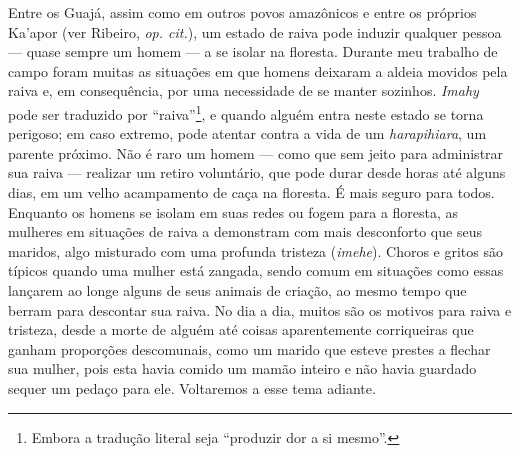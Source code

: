 Entre os Guajá, assim como em outros povos amazônicos e entre os
próprios Ka'apor (ver Ribeiro, \emph{op. cit.}), um estado de raiva pode
induzir qualquer pessoa --- quase sempre um homem --- a se isolar na
floresta. Durante meu trabalho de campo foram muitas as situações em que
homens deixaram a aldeia movidos pela raiva e, em consequência, por uma
necessidade de se manter sozinhos. \emph{Imahy} pode ser traduzido por
``raiva''\footnote{Embora a tradução literal seja ``produzir dor a si
  mesmo''.}, e quando alguém entra neste estado se torna perigoso; em
caso extremo, pode atentar contra a vida de um \emph{harapihiara}, um
parente próximo. Não é raro um homem --- como que sem jeito para
administrar sua raiva --- realizar um retiro voluntário, que pode durar
desde horas até alguns dias, em um velho acampamento de caça na
floresta. É mais seguro para todos. Enquanto os homens se isolam em suas
redes ou fogem para a floresta, as mulheres em situações de raiva a
demonstram com mais desconforto que seus maridos, algo misturado com uma
profunda tristeza (\emph{imehe}). Choros e gritos são típicos quando uma
mulher está zangada, sendo comum em situações como essas lançarem ao
longe alguns de seus animais de criação, ao mesmo tempo que berram para
descontar sua raiva. No dia a dia, muitos são os motivos para raiva e
tristeza, desde a morte de alguém até coisas aparentemente corriqueiras
que ganham proporções descomunais, como um marido que esteve prestes a
flechar sua mulher, pois esta havia comido um mamão inteiro e não havia
guardado sequer um pedaço para ele. Voltaremos a esse tema adiante.

